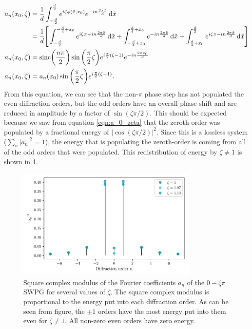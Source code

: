 \begin{equation}
\label{eqn:a_n_zeta}
	\begin{aligned}
	a_n(x_0,\zeta) &= \frac{1}{d}\int_{-\frac{d}{2}}^{\frac{d}{2}} e^{i\zeta\phi(\tilde{x},x_0)}e^{-i n \frac{2\pi\tilde{x}}{d}}\mathop{}\!\mathrm{d}\tilde{x}\\
	&= \frac{1}{d}\Bigg[\int_{-\frac{d}{2}}^{-\frac{d}{4}+x_0}e^{i\zeta\pi-i n \frac{2\pi\tilde{x}}{d}} \mathop{}\!\mathrm{d}\tilde{x}
	+ \int_{-\frac{d}{4}+x_0}^{\frac{d}{4}+x_0}e^{-i n \frac{2\pi\tilde{x}}{d}} \mathop{}\!\mathrm{d}\tilde{x}
	+ \int_{\frac{d}{4}+x_0}^{\frac{d}{2}} e^{i\zeta\pi-i n \frac{2\pi\tilde{x}}{d}}\mathop{}\!\mathrm{d}\tilde{x} \Bigg]\\
	a_n(x_0, \zeta) & = \mathrm{sinc}\bigg(\frac{n\pi}{2}\bigg)\sin\bigg(\frac{\pi}{2}\zeta\bigg) e^{i\frac{\pi}{2} (\zeta - 1)} e^{-in\frac{2\pi x_0}{d}}\\
	a_n(x_0,\zeta) &= a_n(x_0)\sin\bigg(\frac{\pi}{2}\zeta\bigg)e^{i\frac{\pi}{2}(\zeta-1)}.
	\end{aligned}
\end{equation} 
From this equation, we can see that the non-$\pi$ phase step has not populated the even diffraction orders, but the odd orders have an overall phase shift and are reduced in amplitude by a factor of $\sin(\zeta\pi/2)$.  This should be expected because we saw from equation \ref{eqn:a_0_zeta} that the zeroth-order was populated by a fractional energy of $\rvert \cos(\zeta\pi/2)\rvert^2$.  Since this is a lossless system ($\sum_{n}\rvert a_n\rvert^2 = 1$), the energy that is populating the zeroth-order is coming from all of the odd orders that were populated. This redistribution of energy by $\zeta\neq1$ is shown in \ref{fig:a_n_zeta}.

\begin{figure}
	\centering
	\includegraphics[width=0.8\textwidth]{figures/Two_source/a_n_zeta.pdf}
	\caption[Square modulus of Fourier coefficients of a $0-\zeta\pi$ SWPG for various $\zeta$]{Square complex modulus of the Fourier coefficients $a_n$ of the $0-\zeta\pi$ SWPG for several values of $\zeta$. The square complex modulus is proportional to the energy put into each diffraction order.  As can be seen from figure, the $\pm1$ orders have the most energy put into them even for $\zeta\neq 1$.  All non-zero even orders have zero energy.}
	\label{fig:a_n_zeta}
\end{figure}

